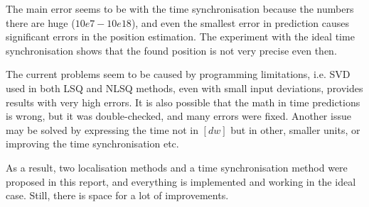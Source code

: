 \documentclass[journal]{IEEEtran}
\begin{document}
The main error seems to be with the time synchronisation because the numbers there are huge ($10e7 - 10e18$), and even the smallest error in prediction causes significant errors in the position estimation. 
The experiment with the ideal time synchronisation shows that the found position is not very precise even then.

The current problems seem to be caused by programming limitations, i.e. SVD used in both LSQ and NLSQ methods, even with small input deviations, provides results with very high errors.
It is also possible that the math in time predictions is wrong, but it was double-checked, and many errors were fixed. 
Another issue may be solved by expressing the time not in $[\si{dw}]$ but in other, smaller units, or improving the time synchronisation etc.

As a result, two localisation methods and a time synchronisation method were proposed in this report, and everything is implemented and working in the ideal case. 
Still, there is space for a lot of improvements.

{}

\cleardoublepage
\end{document}
